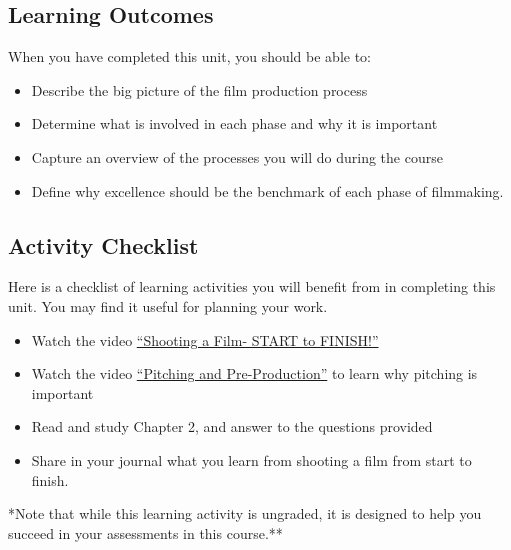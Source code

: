 \documentclass[
]{book}
\providecommand{\tightlist}{%
  \setlength{\itemsep}{0pt}\setlength{\parskip}{0pt}}
\begin{document}
\hypertarget{learning-outcomes-1}{%
\subsection*{Learning Outcomes}\label{learning-outcomes-1}}

When you have completed this unit, you should be able to:

\begin{itemize}
\item
  Describe the big picture of the film production process
\item
  Determine what is involved in each phase and why it is important
\item
  Capture an overview of the processes you will do during the course
\item
  Define why excellence should be the benchmark of each phase of filmmaking.
\end{itemize}

\hypertarget{activity-checklist-1}{%
\subsection*{Activity Checklist}\label{activity-checklist-1}}

\begin{reflect}
Here is a checklist of learning activities you will benefit from in completing this unit. You may find it useful for planning your work.

\begin{itemize}
\tightlist
\item
  Watch the video \href{https://www.youtube.com/watch?v=8NCLf9rF6IQ}{``Shooting a Film- START to FINISH!''}
\item
  Watch the video \href{https://www.youtube.com/watch?v=JE53JL60ihc}{``Pitching and Pre-Production''} to learn why pitching is important
\item
  Read and study Chapter 2, and answer to the questions provided
\item
  Share in your journal what you learn from shooting a film from start to finish.
\end{itemize}

*Note that while this learning activity is ungraded, it is designed to help you succeed in your assessments in this course.**
\end{reflect}
\end{document}
